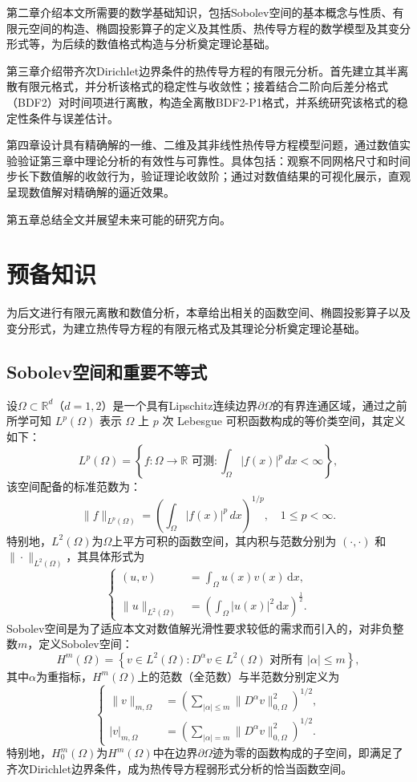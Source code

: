 \documentclass{GZUbachelorthesis}
\theoremstyle{chineseplain}
\begin{document}
第二章介绍本文所需要的数学基础知识，包括Sobolev空间的基本概念与性质、有限元空间的构造、椭圆投影算子的定义及其性质、热传导方程的数学模型及其变分形式等，为后续的数值格式构造与分析奠定理论基础。

第三章介绍带齐次Dirichlet边界条件的热传导方程的有限元分析。首先建立其半离散有限元格式，并分析该格式的稳定性与收敛性；接着结合二阶向后差分格式（BDF2）对时间项进行离散，构造全离散BDF2-P1格式，并系统研究该格式的稳定性条件与误差估计。

第四章设计具有精确解的一维、二维及其非线性热传导方程模型问题，通过数值实验验证第三章中理论分析的有效性与可靠性。具体包括：观察不同网格尺寸和时间步长下数值解的收敛行为，验证理论收敛阶；通过对数值结果的可视化展示，直观呈现数值解对精确解的逼近效果。

第五章总结全文并展望未来可能的研究方向。
\newpage
\section{预备知识}
为后文进行有限元离散和数值分析，本章给出相关的函数空间、椭圆投影算子以及变分形式，为建立热传导方程的有限元格式及其理论分析奠定理论基础。
\subsection{Sobolev空间和重要不等式}
设$\Omega \subset \mathbb{R}^d$（$d=1,2$）是一个具有Lipschitz连续边界$\partial\Omega$的有界连通区域，通过之前所学可知 \(L^p(\Omega)\) 表示 \(\Omega\) 上 \(p\) 次 Lebesgue 可积函数构成的等价类空间，其定义如下：
\[
L^p(\Omega) = \left\{ f: \Omega \to \mathbb{R} \text{ 可测}: \int_{\Omega} |f(x)|^p \, dx < \infty \right\},
\]
该空间配备的标准范数为：
\[
\|f\|_{L^p(\Omega)} = \left( \int_{\Omega} |f(x)|^p \, dx \right)^{1/p}, \quad 1 \leq p < \infty.
\]
特别地，$L^2(\Omega)$为$\Omega$上平方可积的函数空间，其内积与范数分别为 $(\cdot,\cdot)$ 和 $\|\cdot\|_{L^2(\Omega)}$，其具体形式为
\[
\left\{
\begin{aligned}
	(u,v)&=\displaystyle\int_\Omega u(x)v(x)\,\mathrm{d}x, \\
	\|u\|_{L^2(\Omega)} &= \displaystyle\left(\int_\Omega |u(x)|^2\,\mathrm{d}x\right)^{\frac{1}{2}}.
\end{aligned}
\right.
\]
Sobolev空间是为了适应本文对数值解光滑性要求较低的需求而引入的，对非负整数$m$，定义Sobolev空间：
\[
H^m(\Omega) = \left\{ v \in L^2(\Omega) : D^{\alpha} v \in L^2(\Omega) \text{ 对所有 } |\alpha| \le m \right\},
\]
其中$\alpha$为重指标，$H^m(\Omega)$上的范数（全范数）与半范数分别定义为
\[
\left\{
\begin{aligned}
	\| v \|_{m, \Omega} &= \left( \sum_{|\alpha| \leq m} \| D^\alpha v \|_{0, \Omega}^2 \right)^{1/2}, \\
	| v |_{m, \Omega}   &= \left( \sum_{|\alpha| = m} \| D^\alpha v \|_{0, \Omega}^2 \right)^{1/2}.
\end{aligned}
\right.
\]
特别地，$H^m_0(\Omega)$为$H^m(\Omega)$中在边界$\partial\Omega$迹为零的函数构成的子空间，即满足了齐次Dirichlet边界条件，成为热传导方程弱形式分析的恰当函数空间。
\end{document}
